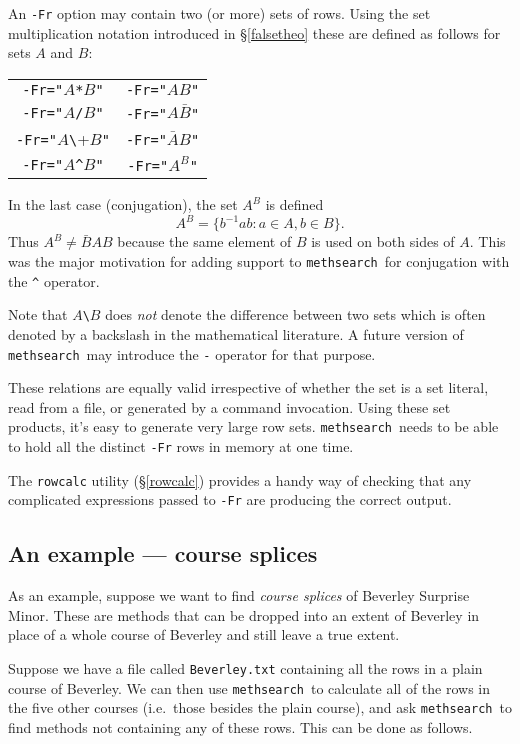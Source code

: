 \documentclass[a4paper,11pt,oneside]{book}
\makeatletter
\def\textitidx#1{\textit{#1}\index{#1}}
\newcommand{\ttcmdidx}[1]{\texttt{#1}\index{#1@{\texttt{#1}}}}
\def\methsearch{\texttt{meth\-search}}
\newcommand{\sref}[1]{\hyperref[#1]{\S\ref{#1}}}
\makeatother
\begin{document}
An \verb+-Fr+ option may contain two (or more) sets of rows.  Using
the set multiplication notation introduced in \sref{falsetheo} these are
defined as follows for sets $A$ and $B$:

\begin{tabular}{c@{$\quad\iff\quad$}c}
\verb+-Fr="+$A$\verb+*+$B$\verb+"+  &  \verb+-Fr="+$A B$\verb+"+ \\
\verb+-Fr="+$A$\verb+/+$B$\verb+"+  &  \verb+-Fr="+$A \bar{B}$\verb+"+ \\
\verb+-Fr="+$A$\verb+\+$B$\verb+"+  &  \verb+-Fr="+$\bar{A} B$\verb+"+ \\
\verb+-Fr="+$A$\verb+^+$B$\verb+"+  &  \verb+-Fr="+$A^B$\verb+"+ \\
\end{tabular}

In the last case (conjugation), the set $A^B$ is defined
\[ A^B = \{ b^{-1} a b : a \in A, b \in B \}. \]
Thus $A^B \not= \bar{B}AB$ because the same element of $B$ is used on both
sides of $A$.  This was the major motivation for adding support to 
\methsearch\ for conjugation with the \verb+^+ operator.

Note that $A$\verb+\+$B$ does \textit{not} denote the difference
between two sets which is often denoted by a backslash in the mathematical
literature.  
A future version of \methsearch\ may introduce the \verb+-+ operator for
that purpose.

These relations are equally valid irrespective of whether the set is a 
set literal, read from a file, or generated by a command invocation.
Using these set products, it's easy to generate very large row sets.  
\methsearch\ needs to be able to hold all the distinct \verb+-Fr+ rows 
in memory at one time.

The \ttcmdidx{rowcalc} utility (\sref{rowcalc}) provides a handy way 
of checking that any complicated expressions passed to \verb+-Fr+
are producing the correct output.

\subsection{An example — course splices}

As an example, suppose we want to find \textitidx{course splices} of
Beverley Surprise Minor.  These are methods that can be dropped into an
extent of Beverley in place of a whole course of Beverley and still 
leave a true extent.

Suppose we have a file called \verb+Beverley.txt+ containing all the rows in 
a plain course of Beverley.  We can then use \methsearch\ to calculate
all of the rows in the five other courses (i.e.\ those besides the plain 
course), and ask \methsearch\ to find methods not containing any of these
rows.  This can be done as follows.
\end{document}
